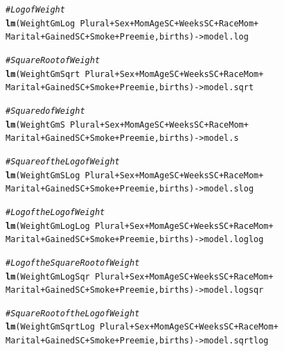 \documentclass{article}\usepackage[]{graphicx}\usepackage[]{xcolor}
\makeatletter
\newcommand{\hlcom}[1]{\textcolor[rgb]{0.678,0.584,0.686}{\textit{#1}}}%
\newcommand{\hlopt}[1]{\textcolor[rgb]{0,0,0}{#1}}%
\newcommand{\hlstd}[1]{\textcolor[rgb]{0.345,0.345,0.345}{#1}}%
\newcommand{\hlkwb}[1]{\textcolor[rgb]{0.69,0.353,0.396}{#1}}%
\newcommand{\hlkwd}[1]{\textcolor[rgb]{0.737,0.353,0.396}{\textbf{#1}}}%
\newenvironment{kframe}{%
 \def\at@end@of@kframe{}%
 \ifinner\ifhmode%
  \def\at@end@of@kframe{\end{minipage}}%
  \begin{minipage}{\columnwidth}%
 \fi\fi%
 \def\FrameCommand##1{\hskip\@totalleftmargin \hskip-\fboxsep
 \colorbox{shadecolor}{##1}\hskip-\fboxsep
     \hskip-\linewidth \hskip-\@totalleftmargin \hskip\columnwidth}%
 \MakeFramed {\advance\hsize-\width
   \@totalleftmargin\z@ \linewidth\hsize
   \@setminipage}}%
 {\par\unskip\endMakeFramed%
 \at@end@of@kframe}
\newenvironment{knitrout}{}{} %
\makeatother
\begin{document}
\begin{knitrout}
\color{fgcolor}\begin{kframe}
\begin{alltt}
\hlcom{# Log of Weight}
\hlkwd{lm}\hlstd{(WeightGmLog} \hlopt{~} \hlstd{Plural} \hlopt{+} \hlstd{Sex} \hlopt{+} \hlstd{MomAgeSC} \hlopt{+} \hlstd{WeeksSC} \hlopt{+} \hlstd{RaceMom} \hlopt{+}
     \hlstd{Marital} \hlopt{+} \hlstd{GainedSC} \hlopt{+} \hlstd{Smoke} \hlopt{+} \hlstd{Preemie, births)} \hlkwb{->} \hlstd{model.log}

\hlcom{# Square Root of Weight}
\hlkwd{lm}\hlstd{(WeightGmSqrt} \hlopt{~} \hlstd{Plural} \hlopt{+} \hlstd{Sex} \hlopt{+} \hlstd{MomAgeSC} \hlopt{+} \hlstd{WeeksSC} \hlopt{+} \hlstd{RaceMom} \hlopt{+}
     \hlstd{Marital} \hlopt{+} \hlstd{GainedSC} \hlopt{+} \hlstd{Smoke} \hlopt{+} \hlstd{Preemie, births)} \hlkwb{->} \hlstd{model.sqrt}

\hlcom{# Squared of Weight}
\hlkwd{lm}\hlstd{(WeightGmS} \hlopt{~} \hlstd{Plural} \hlopt{+} \hlstd{Sex} \hlopt{+} \hlstd{MomAgeSC} \hlopt{+} \hlstd{WeeksSC} \hlopt{+} \hlstd{RaceMom} \hlopt{+}
     \hlstd{Marital} \hlopt{+} \hlstd{GainedSC} \hlopt{+} \hlstd{Smoke} \hlopt{+} \hlstd{Preemie, births)} \hlkwb{->} \hlstd{model.s}

\hlcom{# Square of the Log of Weight}
\hlkwd{lm}\hlstd{(WeightGmSLog} \hlopt{~} \hlstd{Plural} \hlopt{+} \hlstd{Sex} \hlopt{+} \hlstd{MomAgeSC} \hlopt{+} \hlstd{WeeksSC} \hlopt{+} \hlstd{RaceMom} \hlopt{+}
     \hlstd{Marital} \hlopt{+} \hlstd{GainedSC} \hlopt{+} \hlstd{Smoke} \hlopt{+} \hlstd{Preemie, births)} \hlkwb{->} \hlstd{model.slog}

\hlcom{# Log of the Log of Weight}
\hlkwd{lm}\hlstd{(WeightGmLogLog} \hlopt{~} \hlstd{Plural} \hlopt{+} \hlstd{Sex} \hlopt{+} \hlstd{MomAgeSC} \hlopt{+} \hlstd{WeeksSC} \hlopt{+} \hlstd{RaceMom} \hlopt{+}
     \hlstd{Marital} \hlopt{+} \hlstd{GainedSC} \hlopt{+} \hlstd{Smoke} \hlopt{+} \hlstd{Preemie, births)} \hlkwb{->} \hlstd{model.loglog}

\hlcom{# Log of the Square Root of Weight}
\hlkwd{lm}\hlstd{(WeightGmLogSqr} \hlopt{~} \hlstd{Plural} \hlopt{+} \hlstd{Sex} \hlopt{+} \hlstd{MomAgeSC} \hlopt{+} \hlstd{WeeksSC} \hlopt{+} \hlstd{RaceMom} \hlopt{+}
     \hlstd{Marital} \hlopt{+} \hlstd{GainedSC} \hlopt{+} \hlstd{Smoke} \hlopt{+} \hlstd{Preemie, births)} \hlkwb{->} \hlstd{model.logsqr}

\hlcom{# Square Root of the Log of Weight}
\hlkwd{lm}\hlstd{(WeightGmSqrtLog} \hlopt{~} \hlstd{Plural} \hlopt{+} \hlstd{Sex} \hlopt{+} \hlstd{MomAgeSC} \hlopt{+} \hlstd{WeeksSC} \hlopt{+} \hlstd{RaceMom} \hlopt{+}
     \hlstd{Marital} \hlopt{+} \hlstd{GainedSC} \hlopt{+} \hlstd{Smoke} \hlopt{+} \hlstd{Preemie, births)} \hlkwb{->} \hlstd{model.sqrtlog}


\end{alltt}
\end{kframe}
\end{knitrout}
\end{document}
